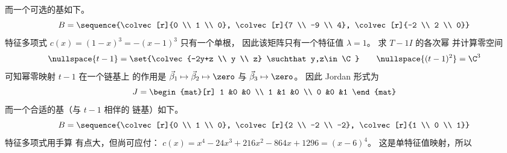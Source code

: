             而一个可选的基如下。
            \begin{equation*}
              B=\sequence{\colvec[r]{0 \\ 1 \\ 0},
                          \colvec[r]{7 \\ -9 \\ 4},
                          \colvec[r]{-2 \\ 2 \\ 0}}
            \end{equation*}
        \partsitem 特征多项式
            \( c(x)=(1-x)^3=-(x-1)^3 \) 只有一个单根，
            因此该矩阵只有一个特征值 $\lambda=1$。
            求 $T-1I$ 的各次幂
            并计算零空间
            \begin{equation*}
               \nullspace{t-1}=\set{\colvec{-2y+z \\ y \\ z}
                                      \suchthat y,z\in\C} 
               \qquad
               \nullspace{(t-1)^2}=\C^3 
            \end{equation*}
            可知幂零映射 $t-1$ 在一个链基上
            的作用是
            $\vec{\beta}_1\mapsto\vec{\beta}_2\mapsto\zero$ 与
            $\vec{\beta}_3\mapsto\zero$。
            因此 Jordan 形式为
            \begin{equation*}
                  J=
                  \begin{mat}[r]
                    1  &0  &0  \\
                    1  &1  &0  \\
                    0  &0  &1
                  \end{mat}
            \end{equation*}
            而一个合适的基（与 $t-1$ 相伴的
            链基）如下。
            \begin{equation*}
              B=\sequence{\colvec[r]{0 \\ 1 \\ 0},
                          \colvec[r]{2 \\ -2 \\ -2},
                          \colvec[r]{1 \\ 0 \\ 1}}
            \end{equation*}
        \partsitem 特征多项式用手算
            有点大，但尚可应付：
            \( c(x)=x^4-24x^3+216x^2-864x+1296=(x-6)^4 \)。
            这是单特征值映射，所以
